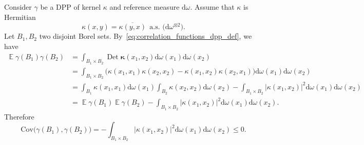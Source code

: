 \documentclass[twoside,11pt]{book}
\numberwithin{theorem}{chapter}
\numberwithin{definition}{chapter}
\numberwithin{proposition}{chapter}
\numberwithin{corollary}{chapter}
\numberwithin{example}{chapter}
\numberwithin{lemma}{chapter}
\numberwithin{assumption}{chapter}
\numberwithin{equation}{chapter}
\numberwithin{figure}{chapter}
\DeclareMathOperator{\Det}{Det}
\DeclareMathOperator{\EX}{\mathbb{E}}
\begin{document}
Consider $\gamma$ be a DPP of kernel $\kappa$ and reference measure $\mathrm{d}\omega$. Assume that $\kappa$ is Hermitian
\begin{equation} \label{eq:hermitian_condition_kappa}
\kappa(x,y) = \overline{\kappa(y,x)} \:\: \text{a.s. (} \mathrm{d}\omega^{\otimes 2} \text{)}.  
\end{equation}
Let $B_{1}, B_{2}$ two disjoint Borel sets. By~\ref{eq:correlation_functions_dpp_def}, we have
\begin{align}\label{eq:cov_DPP_gamma_B_1_B_2_dev}
\EX \gamma(B_{1}) \gamma(B_{2}) & = \int_{B_{1} \times B_{2}} \Det \bm{\kappa}(x_{1},x_{2}) \mathrm{d}\omega(x_1) \mathrm{d}\omega(x_2) \nonumber\\
& = \int_{B_{1} \times B_{2}} \Big( \kappa(x_{1},x_{1}) \kappa(x_{2},x_{2}) - \kappa(x_{1},x_{2}) \kappa(x_{2},x_{1}) \Big) \mathrm{d}\omega(x_1) \mathrm{d}\omega(x_2)  \nonumber\\
& = \int_{B_{1}} \kappa(x_{1},x_{1}) \mathrm{d}\omega(x_1) \int_{B_{2}} \kappa(x_{2},x_{2}) \mathrm{d}\omega(x_2) - \int_{B_{1} \times B_{2}} |\kappa(x_{1},x_{2})|^{2} \mathrm{d}\omega(x_1) \mathrm{d}\omega(x_2)  \nonumber\\
& = \EX \gamma(B_{1}) \EX \gamma(B_{2}) - \int_{B_{1} \times B_{2}} |\kappa(x_{1},x_{2})|^{2} \mathrm{d}\omega(x_1) \mathrm{d}\omega(x_2). 
\end{align}
Therefore
\begin{equation} \label{eq:cov_DPP_gamma_B_1_B_2}
\mathrm{Cov} \Big(\gamma(B_{1}), \gamma(B_{2}) \Big)  =  - \int_{B_{1} \times B_{2}} |\kappa(x_{1},x_{2})|^{2} \mathrm{d}\omega(x_1) \mathrm{d}\omega(x_2) \leq 0.
\end{equation}
\end{document}
